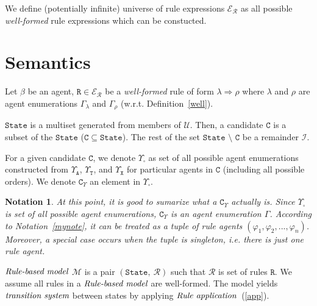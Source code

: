 \documentclass{entcs}
\renewcommand{\~}[0]{\texttildelow}
\newtheorem{notation}[thm]{Notation}
\begin{document}
\begin{theorem}
We define (potentially infinite) universe of rule expressions $\mathcal{E}_\mathcal{R} $ as all possible \emph{well-formed} rule expressions which can be constucted.
\end{theorem}

\section{Semantics}

Let $\beta$ be an agent, $\mathtt{R} \in \mathcal{E}_\mathcal{R}$ be a \emph{well-formed} rule of form $\lambda \Rightarrow \rho$ where $\lambda$ and $\rho$ are agent enumerations $\Gamma_\lambda$ and $\Gamma_\rho$ (w.r.t. Definition~\ref{well}).

\begin{defn}
$\mathtt{State}$ is a multiset generated from members of $\mathcal{U}$. Then, a candidate $\mathtt{C}$ is a subset of the $\mathtt{State}$ ($\mathtt{C} \subseteq \mathtt{State}$). The rest of the set $ \mathtt{State}$ $\setminus$ $\mathtt{C}$ be a remainder $\mathcal{I}$.
\end{defn}

\begin{defn}
For a given candidate $\mathtt{C}$, we denote $\Upsilon_{\square}$ as set of all possible agent enumerations constructed from $\Upsilon_\mathtt{A}$, $\Upsilon_\mathtt{T}$, and $\Upsilon_\mathtt{X}$ for particular agents in $\mathtt{C}$ (including all possible orders). We denote $\mathtt{C}_\Upsilon$ an element in $\Upsilon_{\square}$.
\end{defn}

\begin{notation}
At this point, it is good to sumarize what a $\mathtt{C}_\Upsilon$ actually is. Since $\Upsilon_{\square}$ is set of all possible agent enumerations, $\mathtt{C}_\Upsilon$ is an agent enumeration $\Gamma$. According to Notation~\ref{mynote}, it can be treated as a tuple of rule agents $(\varphi_1, \varphi_2, ..., \varphi_n)$. Moreover, a special case occurs when the tuple is singleton, i.e. there is just one rule agent.
\end{notation}

\begin{defn}
$\emph{Rule-based model}$ $\mathcal{M}$ is a pair $ (\mathtt{State},~\mathcal{R}) $ such that $\mathcal{R}$ is set of rules $\mathtt{R}$. We assume all rules in a $\emph{Rule-based model}$ are well-formed. The model yields $\emph{transition system}$ between states by applying $\emph{Rule application}$~(\ref{app}).
\end{defn}
\end{document}
